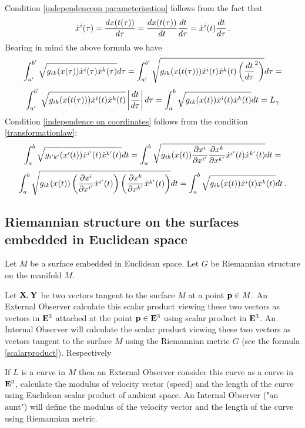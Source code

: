 \documentclass[12pt]{article}
\theoremstyle{theorem}
\numberwithin{equation}{section}
\begin{document}
Condition \eqref{independenceon parameterisation} follows from the fact that
  $$
  \dot x^i(\tau)={dx(t(\tau))\over d\tau}=
  {dx(t(\tau))\over d t}{dt\over d\tau}=
  \dot x^i(t){dt\over d\tau}\,.
  $$
Bearing in mind the above formula we have
           $$
        \int_{a'}^{b'} \sqrt {g_{ik}(x(\tau))\dot x^i(\tau) \dot x^k(\tau)}d\tau=
        \int_{a'}^{b'} \sqrt {g_{ik}(x(t(\tau)))\dot x^i(t) \dot x^k(t)\left({dt\over d\tau}^2\right)}d\tau=
           $$
           $$
           \int_{a'}^{b'} \sqrt {g_{ik}(x(t(\tau)))\dot x^i(t) \dot x^k(t)}\left|{dt\over d\tau}\right|d\tau=
           \int_a^b \sqrt {g_{ik}(x(t))\dot x^i(t) \dot x^k(t)}dt=L_\gamma
           $$
Condition \eqref{independence on coordinates} follows from the condition \eqref{transformationlaw}:
  $$
  \int_a^b \sqrt {g_{i'k'}(x'(t))\dot x^{i'}(t) \dot x^{k'}(t)}dt=
  \int_a^b \sqrt {g_{ik}(x(t)){\partial x^i\over \partial x^{i'}}{\partial x^k\over \partial x^{k'}}\dot x^{i'}(t) \dot x^{k'}(t)}dt=
   $$
   \begin{equation}\label{transformlaw2}
     \int_a^b \sqrt {g_{ik}(x(t))
     \left({\partial x^i\over \partial x^{i'}}\dot x^{i'}(t)\right)\left({\partial x^k\over \partial x^{k'}}\dot x^{k'}(t)\right) }dt=
     \int_a^b \sqrt {g_{ik}(x(t))\dot x^{i}(t)\dot x^{k}(t) }dt\,.
   \end{equation}


\subsection{Riemannian structure on the surfaces embedded in Euclidean space}

Let $M$ be a surface embedded in Euclidean space. Let $G$ be Riemannian structure on the manifold $M$.

  Let ${\bf X}, {\bf Y}$ be two vectors tangent to the surface
$M$ at a point ${\bf p}\in M$. An External Observer calculate this scalar product viewing
these two vectors as vectors in ${\bf E}^3$ attached at the point ${\bf p}\in {\bf E}^3$
using scalar product in   ${\bf E}^3$.  An Internal Observer will calculate the scalar product
viewing these two vectors as vectors  tangent to the surface $M$
using the Riemannian
metric $G$ (see the formula \eqref{scalarproduct}).  Respectively





If $L$ is a curve in $M$ then an External Observer consider this curve as a curve in ${\bf E}^3$,
calculate the modulus of velocity  vector (speed) and the length of the curve using Euclidean scalar
product of ambient space. An Internal Observer ("an aunt") will define the modulus of the velocity vector and
the length of the curve using Riemannian metric.
\end{document}
